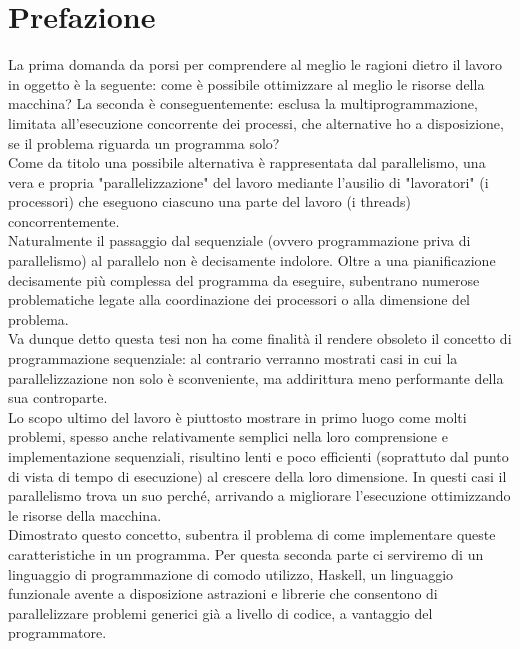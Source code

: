 \chapter*{Prefazione}

La prima domanda da porsi per comprendere al meglio le ragioni dietro il lavoro in oggetto è la seguente: come è possibile ottimizzare al meglio le risorse della macchina? La seconda è conseguentemente: esclusa la multiprogrammazione, limitata all'esecuzione concorrente dei processi, che alternative ho a disposizione, se il problema riguarda un programma solo?\\
Come da titolo una possibile alternativa è rappresentata dal parallelismo, una vera e propria "parallelizzazione" del lavoro mediante l'ausilio di "lavoratori" (i processori) che eseguono ciascuno una parte del lavoro (i threads) concorrentemente.\\
Naturalmente il passaggio dal sequenziale (ovvero programmazione priva di parallelismo) al parallelo non è decisamente indolore. Oltre a una pianificazione decisamente più complessa del programma da eseguire, subentrano numerose problematiche legate alla coordinazione dei processori o alla dimensione del problema.\\ 
Va dunque detto questa tesi non ha come finalità il rendere obsoleto il concetto di programmazione sequenziale: al contrario verranno mostrati casi in cui la parallelizzazione non solo è sconveniente, ma addirittura meno performante della sua controparte.\\
Lo scopo ultimo del lavoro è piuttosto mostrare in primo luogo come molti problemi, spesso anche relativamente semplici nella loro comprensione e implementazione sequenziali, risultino lenti e poco efficienti (soprattuto dal punto di vista di tempo di esecuzione) al crescere della loro dimensione. In questi casi il parallelismo trova un suo perché, arrivando a migliorare l'esecuzione ottimizzando le risorse della macchina.\\
Dimostrato questo concetto, subentra il problema di come implementare queste caratteristiche in un programma. Per questa seconda parte ci serviremo di un linguaggio di programmazione di comodo utilizzo, Haskell, un linguaggio funzionale avente a disposizione astrazioni e librerie che consentono di parallelizzare problemi generici già a livello di codice, a vantaggio del programmatore.